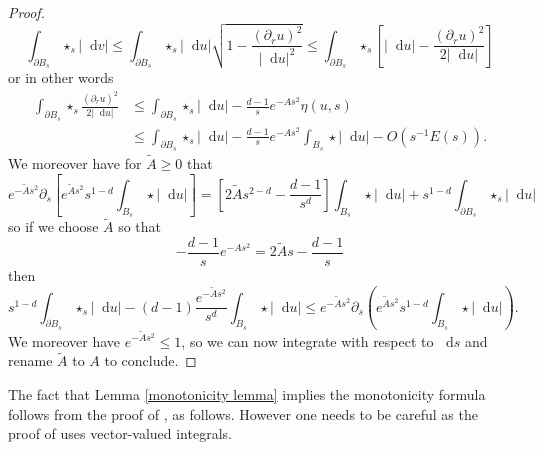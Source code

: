 \documentclass[reqno,11pt]{amsart}
\newcommand*\dif{\mathop{}\!\mathrm{d}}
\theoremstyle{definition}
\numberwithin{equation}{section}
\begin{document}
\begin{proof}
$$\int_{\partial B_s} \star_s |\dif v| \leq \int_{\partial B_s} \star_s |\dif u| \sqrt{1 - \frac{(\partial_r u)^2}{|\dif u|^2}} \leq \int_{\partial B_s} \star_s \left[|\dif u| - \frac{(\partial_r u)^2}{2 |\dif u|}\right]$$
or in other words
\begin{align*}
\int_{\partial B_s} \star_s \frac{(\partial_r u)^2}{2|\dif u|} &\leq \int_{\partial B_s} \star_s |\dif u| - \frac{d - 1}{s} e^{-As^2} \eta(u, s)\\
&\leq \int_{\partial B_s} \star_s |\dif u| - \frac{d - 1}{s} e^{-As^2} \int_{B_s} \star |\dif u| - O(s^{-1}E(s)).
\end{align*}
We moreover have for $\tilde A \geq 0$ that
$$e^{-\tilde As^2} \partial_s \left[e^{\tilde As^2} s^{1 - d} \int_{B_s} \star |\dif u|\right] = \left[2\tilde As^{2 - d} - \frac{d - 1}{s^d}\right]\int_{B_s} \star |\dif u| + s^{1 - d} \int_{\partial B_s} \star_s |\dif u|$$
so if we choose $\tilde A$ so that
$$-\frac{d - 1}{s} e^{-As^2} = 2\tilde As - \frac{d - 1}{s}$$
then
$$s^{1 - d} \int_{\partial B_s} \star_s |\dif u| - (d - 1)\frac{e^{-\tilde As^2}}{s^d} \int_{B_s} \star|\dif u| \leq e^{-\tilde As^2} \partial_s\left(e^{\tilde As^2} s^{1 - d} \int_{B_s} \star|\dif u|\right).$$
We moreover have $e^{-\tilde As^2} \leq 1$, so we can now integrate with respect to $\dif s$ and rename $\tilde A$ to $A$ to conclude.
\end{proof}

The fact that Lemma \ref{monotonicity lemma} implies the monotonicity formula follows from the proof of \cite[Proposition 5.12]{Giusti77}, as follows.
However one needs to be careful as the proof of \cite{Giusti77} uses vector-valued integrals.
\end{document}
